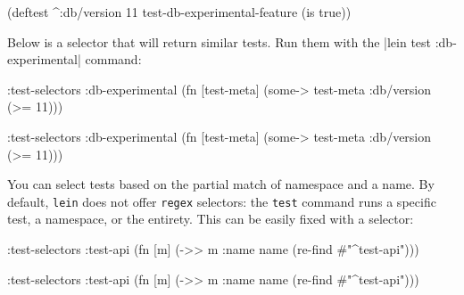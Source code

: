 \begin{english}
  \begin{clojure}
(deftest ^{:db/version 11}
  test-db-experimental-feature
  (is true))
  \end{clojure}
\end{english}

Below is a selector that will return similar tests. Run them with the \spverb|lein test :db-experimental| command:

\ifnarrow

\begin{english}
  \begin{clojure}
:test-selectors
  {:db-experimental
   (fn [test-meta]
     (some-> test-meta
             :db/version
             (>= 11)))}
  \end{clojure}
\end{english}

\else

\begin{english}
  \begin{clojure}
:test-selectors {:db-experimental
                 (fn [test-meta]
                   (some-> test-meta :db/version (>= 11)))}
  \end{clojure}
\end{english}

\fi

You can select tests based on the partial match of namespace and a name. By default, \verb|lein| does not offer \verb|regex| selectors: the \verb|test| command runs a specific test, a namespace, or the entirety. This can be easily fixed with a selector:

\ifnarrow

\begin{english}
  \begin{clojure}
:test-selectors
  {:test-api
   (fn [m]
     (->> m :name name
          (re-find #"^test-api")))}
  \end{clojure}
\end{english}

\else

\begin{english}
  \begin{clojure}
:test-selectors {:test-api
                 (fn [m] (->> m :name name
                              (re-find #"^test-api")))}
  \end{clojure}
\end{english}

\fi

